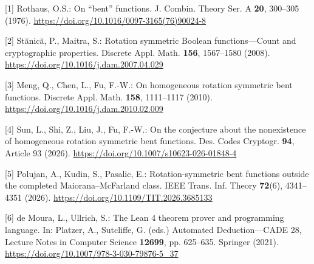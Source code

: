 \documentclass[pdflatex,sn-mathphys-num]{sn-jnl}
\begin{document}
[1] Rothaus, O.S.: On ``bent'' functions. J. Combin. Theory Ser. A \textbf{20}, 300--305 (1976). \url{https://doi.org/10.1016/0097-3165(76)90024-8}

[2] St\u{a}nic\u{a}, P., Maitra, S.: Rotation symmetric Boolean functions---Count and cryptographic properties. Discrete Appl. Math. \textbf{156}, 1567--1580 (2008). \url{https://doi.org/10.1016/j.dam.2007.04.029}

[3] Meng, Q., Chen, L., Fu, F.-W.: On homogeneous rotation symmetric bent functions. Discrete Appl. Math. \textbf{158}, 1111--1117 (2010). \url{https://doi.org/10.1016/j.dam.2010.02.009}

[4] Sun, L., Shi, Z., Liu, J., Fu, F.-W.: On the conjecture about the nonexistence of homogeneous rotation symmetric bent functions. Des. Codes Cryptogr. \textbf{94}, Article 93 (2026). \url{https://doi.org/10.1007/s10623-026-01848-4}

[5] Polujan, A., Kudin, S., Pasalic, E.: Rotation-symmetric bent functions outside the completed Maiorana--McFarland class. IEEE Trans. Inf. Theory \textbf{72}(6), 4341--4351 (2026). \url{https://doi.org/10.1109/TIT.2026.3685133}

[6] de Moura, L., Ullrich, S.: The Lean 4 theorem prover and programming language. In: Platzer, A., Sutcliffe, G. (eds.) Automated Deduction---CADE 28, Lecture Notes in Computer Science \textbf{12699}, pp. 625--635. Springer (2021). \url{https://doi.org/10.1007/978-3-030-79876-5\_37}
\end{document}
